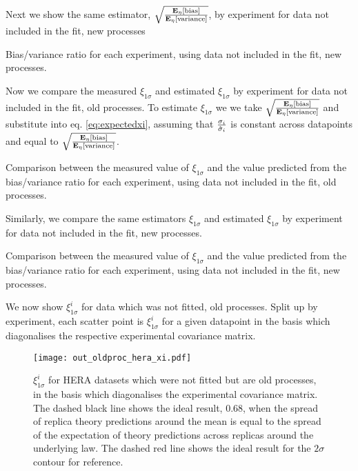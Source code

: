 Next we show the same estimator, $\sqrt{\frac{\mathbf{E}_{\eta}\left[ {\rm bias} \right]}{\mathbf{E}_{\eta}\left[ {\rm variance} \right]}}$,
by experiment for data not included in the fit, new processes

\begin{table}[h!]
    \label{tab:fullout_sqrt_ratio}
    
    \caption{Bias/variance ratio for each experiment, using data not included in the fit, new processes.}
\end{table}

Now we compare the measured $\xi_{1\sigma}$ and estimated $\xi_{1\sigma}$ by
experiment for data not included in the fit, old processes. To estimate
$\xi_{1\sigma}$ we we take $\sqrt{\frac{\mathbf{E}_{\eta}\left[ {\rm bias} \right]}{\mathbf{E}_{\eta}\left[ {\rm variance} \right]}}$ and
substitute into eq. \eqref{eq:expectedxi}, assuming that
$\frac{\sigma_i}{\hat{\sigma}_i}$ is constant across datapoints and equal to
$\sqrt{\frac{\mathbf{E}_{\eta}\left[ {\rm bias} \right]}{\mathbf{E}_{\eta}\left[ {\rm variance} \right]}}$.

\begin{table}[h!]
    \label{tab:partialout_xicomp}
    
    \caption{Comparison between the measured value of $\xi_{1\sigma}$ and the value predicted from the bias/variance ratio for each experiment, using data not included in the fit, old processes.}
\end{table}

Similarly, we compare the same estimators $\xi_{1\sigma}$ and estimated
$\xi_{1\sigma}$ by experiment for data not included in the fit, new processes.

\begin{table}[h!]
    \label{tab:fullout_xicomp}
    
    \caption{Comparison between the measured value of $\xi_{1\sigma}$ and the value predicted from the bias/variance ratio for each experiment, using data not included in the fit, new processes.}
\end{table}

\FloatBarrier

We now show $\xi_{1\sigma}^{i}$ for data which was not fitted, old processes.
Split up by experiment, each scatter point is $\xi_{1\sigma}^{i}$ for a given
datapoint in the basis which diagonalises the respective experimental covariance
matrix.

\begin{figure}[!b]
    \centering
    \texttt{[image: out\_oldproc\_hera\_xi.pdf]}
    \caption{$\xi_{1\sigma}^{i}$ for HERA datasets which were not fitted
    but are old processes, in the basis which diagonalises the experimental
    covariance matrix. The dashed black line shows the ideal result, 0.68, when
    the spread of replica theory predictions around the mean is equal to the
    spread of the expectation of theory predictions across replicas around the
    underlying law. The dashed red line shows the ideal result for the $2\sigma$
    contour for reference.}
    \label{fig:outoldheraxi}
\end{figure}


